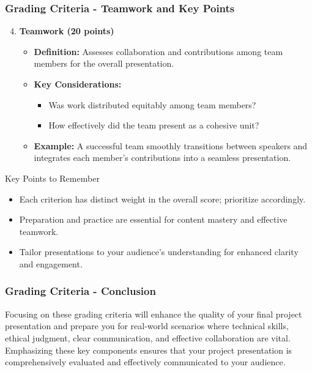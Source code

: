 \documentclass[aspectratio=169]{beamer}
\begin{document}
\begin{frame}[fragile]
    \frametitle{Grading Criteria - Teamwork and Key Points}
    \begin{enumerate}
        \setcounter{enumi}{3}
        \item \textbf{Teamwork (20 points)}
        \begin{itemize}
            \item \textbf{Definition:} Assesses collaboration and contributions among team members for the overall presentation.
            \item \textbf{Key Considerations:}
            \begin{itemize}
                \item Was work distributed equitably among team members?
                \item How effectively did the team present as a cohesive unit?
            \end{itemize}
            \item \textbf{Example:} A successful team smoothly transitions between speakers and integrates each member's contributions into a seamless presentation.
        \end{itemize}
    \end{enumerate}
    
    \begin{block}{Key Points to Remember}
        \begin{itemize}
            \item Each criterion has distinct weight in the overall score; prioritize accordingly.
            \item Preparation and practice are essential for content mastery and effective teamwork.
            \item Tailor presentations to your audience's understanding for enhanced clarity and engagement.
        \end{itemize}
    \end{block}
\end{frame}

\begin{frame}[fragile]
    \frametitle{Grading Criteria - Conclusion}
    Focusing on these grading criteria will enhance the quality of your final project presentation and prepare you for real-world scenarios where technical skills, ethical judgment, clear communication, and effective collaboration are vital. Emphasizing these key components ensures that your project presentation is comprehensively evaluated and effectively communicated to your audience.
\end{frame}
\end{document}
